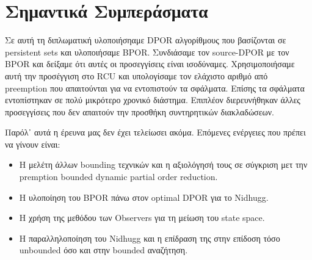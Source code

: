 \chapter{Σημαντικά Συμπεράσματα}
\label{Chapter 6}

Σε αυτή τη διπλωματική υλοποιήσηαμε DPOR αλγορίθμους που βασίζονται σε persistent sets και υλοποιήσαμε BPOR.
Συνδιάσαμε τον source-DPOR με τον BPOR και δείξαμε ότι αυτές οι προσεγγίσεις είναι ισοδύναμες. Χρησιμοποιήσαμε αυτή την προσέγγιση στο
RCU και υπολογίσαμε τον ελάχιστο αριθμό από preemption που απαιτούνται για να εντοπιστούν τα σφάλματα. Επίσης τα σφάλματα εντοπίστηκαν
σε πολύ μικρότερο χρονικό διάστημα. Επιπλέον διερευνήθηκαν άλλες προσεγγίσεις που δεν απαιτούν την προσθήκη συντηρητικών διακλαδώσεων.

Παρόλ᾽ αυτά η έρευνα μας δεν έχει τελείωσει ακόμα. Επόμενες ενέργειες που πρέπει να γίνουν είναι:

\begin{itemize}
    \item Η μελέτη άλλων bounding τεχνικών και η αξιολόγησή τους σε σύγκριση μετ την premption bounded dynamic
    partial order reduction.
    \item Η υλοποίηση του BPOR πάνω στον optimal DPOR για το Nidhugg.
    \item Η χρήση της μεθόδου των  Observers για τη μείωση του state space.
    \item Η παραλληλοποίηση του Nidhugg και η επίδραση της στην επίδοση τόσο unbounded όσο και στην bounded αναζήτηση.
\end{itemize}